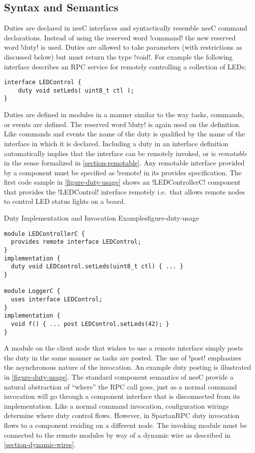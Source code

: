 \subsection{Syntax and Semantics}
\label{section-duties-syntax}

Duties are declared in nesC interfaces and syntactically resemble nesC command declarations.
Instead of using the reserved word !command! the new reserved word !duty! is used. Duties are
allowed to take parameters (with restrictions as discussed below) but must return the type
!void!. For example the following interface describes an RPC service for remotely controlling a
collection of LEDs:

\singlespace
\begin{lstlisting}
interface LEDControl {
    duty void setLeds( uint8_t ctl );
}
\end{lstlisting}
\primaryspacing

Duties are defined in modules in a manner similar to the way tasks, commands, or events are
defined. The reserved word !duty! is again used on the definition. Like commands and events the
name of the duty is qualified by the name of the interface in which it is declared. Including a
duty in an interface definition automatically implies that the interface can be remotely
invoked, or is \emph{remotable} in the sense formalized in \autoref{section-remotable}. Any
remotable interface provided by a component must be specified as !remote! in its provides
specification. The first code sample in \autoref{figure-duty-usage} shows an !LEDControllerC!
component that provides the !LEDControl! interface remotely i.e.~that allows remote nodes to
control LED status lights on a board.

\begin{fpfig}[t]{Duty Implementation and Invocation Examples}{figure-duty-usage}
{
\singlespace
\begin{lstlisting}
module LEDControllerC {
  provides remote interface LEDControl;
}
implementation {
  duty void LEDControl.setLeds(uint8_t ctl) { ... }
} 
 
module LoggerC {
  uses interface LEDControl;
}
implementation {
  void f() { ... post LEDControl.setLeds(42); }
}
\end{lstlisting}
\primaryspacing
}
\end{fpfig}

A module on the client node that wishes to use a remote interface simply posts the duty in the
same manner as tasks are posted. The use of !post! emphasizes the asynchronous nature of the
invocation. An example duty posting is illustrated in \autoref{figure-duty-usage}. The standard
component semantics of nesC provide a natural abstraction of ``where'' the RPC call goes, just
as a normal command invocation will go through a component interface that is disconnected from
its implementation. Like a normal command invocation, configuration wirings determine where duty
control flows. However, in SpartanRPC duty invocation flows to a component residing on a
different node. The invoking module must be connected to the remote modules by way of a dynamic
wire as described in \autoref{section-dynamic-wires}.


